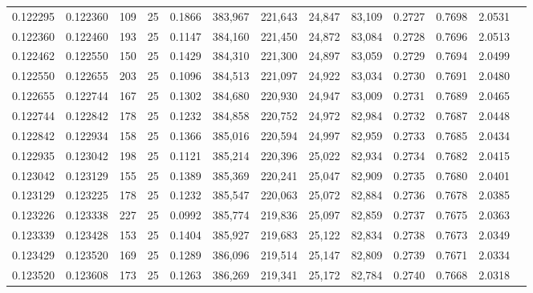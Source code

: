 \begin{tabular}{rrrrrrrrrrrrr}
0.122295 & 0.122360 &   109 &  25 &                                     0.1866 & 383,967 & 221,643 &  24,847 &  83,109 & 0.2727 & 0.7698 & 2.0531 \\
0.122360 & 0.122460 &   193 &  25 &                                     0.1147 & 384,160 & 221,450 &  24,872 &  83,084 & 0.2728 & 0.7696 & 2.0513 \\
0.122462 & 0.122550 &   150 &  25 &                                     0.1429 & 384,310 & 221,300 &  24,897 &  83,059 & 0.2729 & 0.7694 & 2.0499 \\
0.122550 & 0.122655 &   203 &  25 &                                     0.1096 & 384,513 & 221,097 &  24,922 &  83,034 & 0.2730 & 0.7691 & 2.0480 \\
0.122655 & 0.122744 &   167 &  25 &                                     0.1302 & 384,680 & 220,930 &  24,947 &  83,009 & 0.2731 & 0.7689 & 2.0465 \\
0.122744 & 0.122842 &   178 &  25 &                                     0.1232 & 384,858 & 220,752 &  24,972 &  82,984 & 0.2732 & 0.7687 & 2.0448 \\
0.122842 & 0.122934 &   158 &  25 &                                     0.1366 & 385,016 & 220,594 &  24,997 &  82,959 & 0.2733 & 0.7685 & 2.0434 \\
0.122935 & 0.123042 &   198 &  25 &                                     0.1121 & 385,214 & 220,396 &  25,022 &  82,934 & 0.2734 & 0.7682 & 2.0415 \\
0.123042 & 0.123129 &   155 &  25 &                                     0.1389 & 385,369 & 220,241 &  25,047 &  82,909 & 0.2735 & 0.7680 & 2.0401 \\
0.123129 & 0.123225 &   178 &  25 &                                     0.1232 & 385,547 & 220,063 &  25,072 &  82,884 & 0.2736 & 0.7678 & 2.0385 \\
0.123226 & 0.123338 &   227 &  25 &                                     0.0992 & 385,774 & 219,836 &  25,097 &  82,859 & 0.2737 & 0.7675 & 2.0363 \\
0.123339 & 0.123428 &   153 &  25 &                                     0.1404 & 385,927 & 219,683 &  25,122 &  82,834 & 0.2738 & 0.7673 & 2.0349 \\
0.123429 & 0.123520 &   169 &  25 &                                     0.1289 & 386,096 & 219,514 &  25,147 &  82,809 & 0.2739 & 0.7671 & 2.0334 \\
0.123520 & 0.123608 &   173 &  25 &                                     0.1263 & 386,269 & 219,341 &  25,172 &  82,784 & 0.2740 & 0.7668 & 2.0318 \\

\end{tabular}

